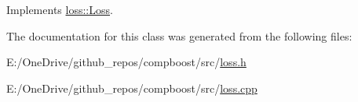 Implements \mbox{\hyperlink{classloss_1_1_loss_ae9f94dd9b8311397583ba3a9cb485e94}{loss\+::\+Loss}}.



The documentation for this class was generated from the following files\+:\begin{DoxyCompactItemize}
\item 
E\+:/\+One\+Drive/github\+\_\+repos/compboost/src/\mbox{\hyperlink{loss_8h}{loss.\+h}}\item 
E\+:/\+One\+Drive/github\+\_\+repos/compboost/src/\mbox{\hyperlink{loss_8cpp}{loss.\+cpp}}\end{DoxyCompactItemize}
